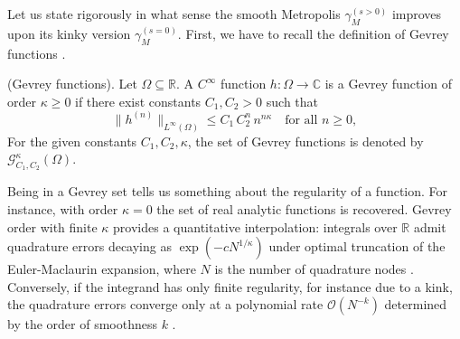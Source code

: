 Let us state rigorously in what sense the smooth Metropolis $\gamma^{(s > 0)}_M$ improves upon its kinky version $\gamma^{(s = 0)}_M$. First, we have to recall the definition of Gevrey functions \cite{adwan2017global}.
\begin{definition}
    \textup{(Gevrey functions).} Let $\Omega \subseteq \mathbb{R}$. A $C^\infty$ function $h: \Omega \to \mathbb{C}$ is a Gevrey function of order $\kappa \geq 0$ if there exist constants $C_1, C_2 > 0$ such that
    \[
    \|h^{(n)}\|_{L^\infty(\Omega)} \leq C_1\, C_2^n\, n^{n \kappa} \quad \text{for all } n \geq 0,
    \]
    For the given constants $C_1, C_2, \kappa$, the set of Gevrey functions is denoted by $\mathcal{G}_{C_1, C_2}^\kappa(\Omega)$.
\end{definition}
Being in a Gevrey set tells us something about the regularity of a function. For instance, with order $\kappa = 0$ the set of real analytic functions is recovered. Gevrey order with finite $\kappa$ provides a quantitative interpolation: integrals over $\mathbb{R}$ admit quadrature errors decaying as $\exp(-c N^{1 / \kappa})$ under optimal truncation of the Euler-Maclaurin expansion, where $N$ is the number of quadrature nodes \cite{trefethen2014exponentially}.
Conversely, if the integrand has only finite regularity, for instance due to a kink, the quadrature errors converge only at a polynomial rate $\mathcal{O}(N^{-k})$ determined by the order of smoothness $k$ \cite{trefethen2014exponentially}.

